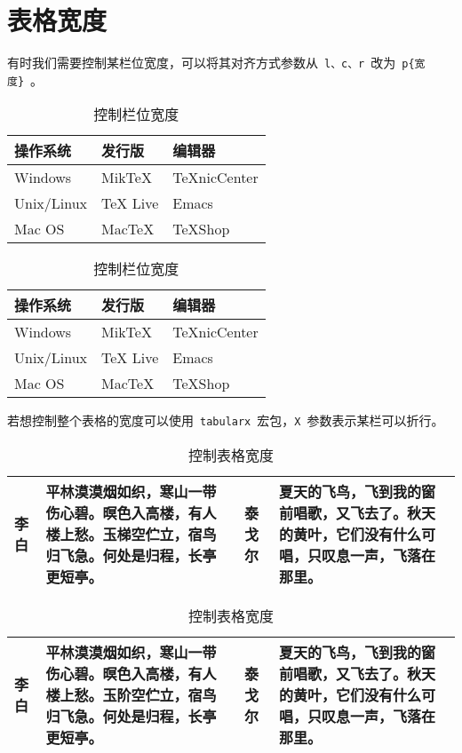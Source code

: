 \section{表格宽度}
有时我们需要控制某栏位宽度，可以将其对齐方式参数从~\verb|l、c、r|~改为~\verb|p{宽度}|~。
\begin{code}
\begin{table}[htbp]
\caption{控制栏位宽度}
\centering
\begin{tabular}{p{100pt}p{100pt}p{100pt}}
    \toprule
    操作系统 & 发行版 & 编辑器 \\
    \midrule
    Windows & MikTeX & TeXnicCenter \\
    Unix/Linux & TeX Live & Emacs \\
    Mac OS & MacTeX & TeXShop \\
    \bottomrule
\end{tabular}
\end{table}
\end{code}

\begin{table}[htbp]
\caption{控制栏位宽度}
\centering
\begin{tabular}{p{100pt}p{100pt}p{100pt}}
    \toprule
    操作系统 & 发行版 & 编辑器 \\
    \midrule
    Windows & MikTeX & TeXnicCenter \\
    Unix/Linux & TeX Live & Emacs \\
    Mac OS & MacTeX & TeXShop \\
    \bottomrule
\end{tabular}
\end{table}

若想控制整个表格的宽度可以使用~\verb|tabularx|~宏包，\verb|X|~参数表示某栏可以折行。

\begin{code}
\begin{table}[htbp]
\caption{控制表格宽度}
\centering
\begin{tabularx}{350pt}{lXlX}
    \toprule
    李白 & 平林漠漠烟如织，寒山一带伤心碧。暝色入高楼，有人楼上愁。玉梯空伫立，宿鸟归飞急。何处是归程，长亭更短亭。& 
    泰戈尔 & 夏天的飞鸟，飞到我的窗前唱歌，又飞去了。秋天的黄叶，它们没有什么可唱，只叹息一声，飞落在那里。\\
    \bottomrule
\end{tabularx}
\end{table}
\end{code}

\begin{table}[htbp]
\caption{控制表格宽度}
\centering
\begin{tabularx}{350pt}{lXlX}
    \toprule
    李白 & 平林漠漠烟如织，寒山一带伤心碧。暝色入高楼，有人楼上愁。玉阶空伫立，宿鸟归飞急。何处是归程，长亭更短亭。& 
    泰戈尔 & 夏天的飞鸟，飞到我的窗前唱歌，又飞去了。秋天的黄叶，它们没有什么可唱，只叹息一声，飞落在那里。\\
    \bottomrule
\end{tabularx}
\end{table}

